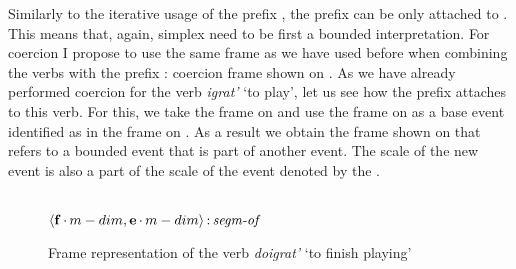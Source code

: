Similarly to the iterative usage of the prefix , the prefix  can be only attached to . This means that, again, simplex  need to be first  a bounded interpretation. For coercion I propose to use the same frame as we have used before when combining the verbs with the prefix : coercion frame shown on . As we have already performed coercion for the verb \textit{igrat'} `to play', let us see how the prefix  attaches to this verb. For this, we take the frame on  and use the frame on  as a base event identified as  in the frame on . As a result we obtain the frame shown on  that refers to a bounded event that is part of another event. The scale of the new event is also a part of the scale of the event denoted by the . 

\begin{figure}\small
 \begin{minipage}{0.45\textwidth}
 \end{minipage}\hfill%
  \begin{minipage}{0.45\textwidth}\centering
 \\
$\langle{\textbf{\textrm{f}}\,{\cdot}\,m-dim,\textbf{\textrm{e}}\,{\cdot}\,m-dim}\rangle\,{:}\,\textit{segm-of}$\\[1ex]
\end{minipage}
\caption{Frame representation of the verb \textit{doigrat'} `to finish playing' \label{frame:do:igrat}}
\end{figure}


